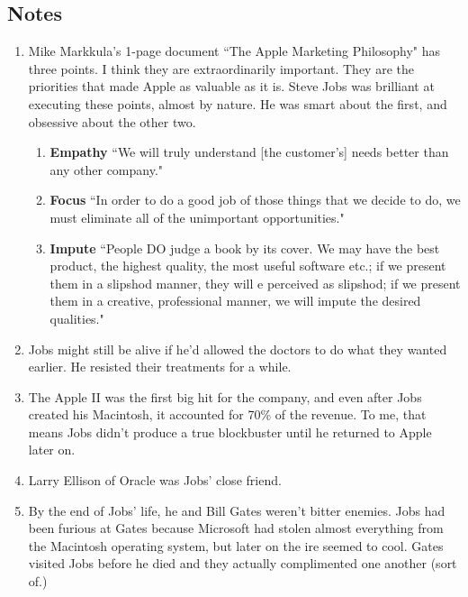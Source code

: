 \documentclass[11pt, oneside]{article}   	%
\begin{document}
\subsection{Notes}
\begin{enumerate}
\item Mike Markkula's 1-page document ``The Apple Marketing Philosophy" has three points.  I think they are extraordinarily important.  They are the priorities that made Apple as valuable as it is.  Steve Jobs was brilliant at executing these points, almost by nature.  He was smart about the first, and obsessive about the other two.

\begin{enumerate}
\item \textbf{Empathy} ``We will truly understand [the customer's] needs better than any other company."
\item \textbf{Focus} ``In order to do a good job of those things that we decide to do, we must eliminate all of the unimportant opportunities."
\item \textbf{Impute} ``People DO judge a book by its cover.  We may have the best product, the highest quality, the most useful software etc.; if we present them in a slipshod manner, they will e perceived as slipshod; if we present them in a creative, professional manner, we will impute the desired qualities."
\end{enumerate}  

\item Jobs might still be alive if he'd allowed the doctors to do what they wanted earlier.  He resisted their treatments for a while.  

\item The Apple II was the first big hit for the company, and even after Jobs created his Macintosh, it accounted for 70\% of the revenue.  To me, that means Jobs didn't produce a true blockbuster until he returned to Apple later on.

\item  Larry Ellison of Oracle was Jobs' close friend.

\item By the end of Jobs' life, he and Bill Gates weren't bitter enemies.  Jobs had been furious at Gates because Microsoft had stolen almost everything from the Macintosh operating system, but later on the ire seemed to cool.  Gates visited Jobs before he died and they actually complimented one another (sort of.)



\end{enumerate}
\end{document}
